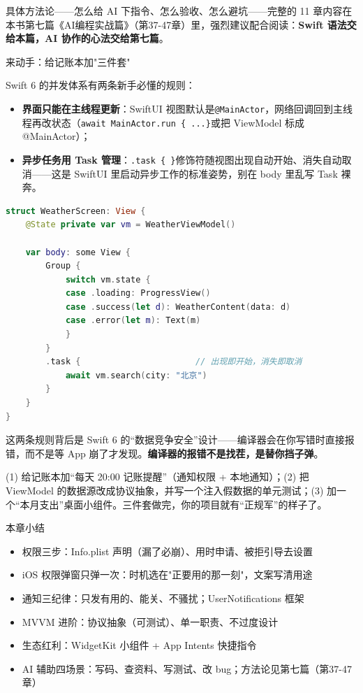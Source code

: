 具体方法论——怎么给 AI 下指令、怎么验收、怎么避坑——完整的 11 章内容在本书第七篇《AI编程实战篇》（第37-47章）里，强烈建议配合阅读：\textbf{Swift 语法交给本篇，AI 协作的心法交给第七篇}。

\begin{tcbpractice}{来动手：给记账本加"三件套"}

Swift 6 的并发体系有两条新手必懂的规则：

\begin{itemize}
  \item \textbf{界面只能在主线程更新}：SwiftUI 视图默认是\texttt{@MainActor}，网络回调回到主线程再改状态（\texttt{await MainActor.\allowbreak run \{ .\allowbreak .\allowbreak .\allowbreak  \}}或把 ViewModel 标成 @MainActor）；
  \item \textbf{异步任务用 Task 管理}：\texttt{.\allowbreak task \{ \}}修饰符随视图出现自动开始、消失自动取消——这是 SwiftUI 里启动异步工作的标准姿势，别在 body 里乱写 Task 裸奔。
\end{itemize}

\begin{lstlisting}[language=Swift]
struct WeatherScreen: View {
    @State private var vm = WeatherViewModel()

    var body: some View {
        Group {
            switch vm.state {
            case .loading: ProgressView()
            case .success(let d): WeatherContent(data: d)
            case .error(let m): Text(m)
            }
        }
        .task {                       // 出现即开始，消失即取消
            await vm.search(city: "北京")
        }
    }
}
\end{lstlisting}

这两条规则背后是 Swift 6 的“数据竞争安全”设计——编译器会在你写错时直接报错，而不是等 App 崩了才发现。\textbf{编译器的报错不是找茬，是替你挡子弹}。

(1) 给记账本加“每天 20:00 记账提醒”（通知权限 + 本地通知）；(2) 把 ViewModel 的数据源改成协议抽象，并写一个注入假数据的单元测试；(3) 加一个“本月支出”桌面小组件。三件套做完，你的项目就有“正规军”的样子了。

\end{tcbpractice}

\begin{tcbsummary}{本章小结}
\begin{itemize}
  \item 权限三步：Info.plist 声明（漏了必崩）、用时申请、被拒引导去设置
  \item iOS 权限弹窗只弹一次：时机选在"正要用的那一刻"，文案写清用途
  \item 通知三纪律：只发有用的、能关、不骚扰；UserNotifications 框架
  \item MVVM 进阶：协议抽象（可测试）、单一职责、不过度设计
  \item 生态红利：WidgetKit 小组件 + App Intents 快捷指令
  \item AI 辅助四场景：写码、查资料、写测试、改 bug；方法论见第七篇（第37-47章）
\end{itemize}

\end{tcbsummary}
